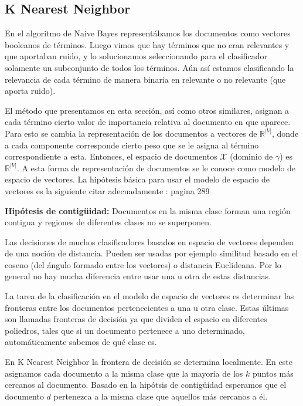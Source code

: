 \documentclass{llncs}
\begin{document}
	\subsection{K Nearest Neighbor}
	
		En el algoritmo de Naive Bayes represent\'abamos los documentos como vectores booleanos de t\'erminos. Luego vimos que hay t\'erminos que no eran relevantes y que aportaban ruido, y lo solucionamos seleccionando para el clasificador solamente un subconjunto de todos los t\'erminos. A\'un as\'i estamos clasificando la relevancia de cada t\'ermino de manera binaria en relevante o no relevante (que aporta ruido).
		
		 El m\'etodo que presentamos en esta secci\'on, as\'i como otros similares, asignan a cada t\'ermino cierto valor de importancia relativa al documento en que aparece. Para esto se cambia la representaci\'on de los documentos a vectores de $\mathbb{R}^{|V|}$, donde a cada componente corresponde cierto peso que se le asigna al t\'ermino correspondiente a esta. Entonces, el espacio de documentos $\mathcal{X}$ (dominio de $\gamma$) es $\mathbb{R}^{|V|}$. A esta forma de representaci\'on de documentos se le conoce como modelo de espacio de vectores. La hip\'otesis b\'asica para usar el modelo de espacio de vectores es la siguiente \color{red} citar adecuadamente : pagina 289 \color{black}
		 
		 \textbf{Hip\'otesis de contig\"uidad:} Documentos en la misma clase forman una regi\'on contigua  y regiones de diferentes clases no se superponen.
		 
		 Las decisiones de muchos clasificadores basados en espacio de vectores dependen de una noci\'on de distancia. Pueden ser usadas por ejemplo similitud basado en el coseno (del \'angulo formado entre los vectores) o distancia Euclideana. Por lo general no hay mucha diferencia entre usar una u otra de estas distancias.
		 
		 La tarea de la clasificaci\'on en el modelo de espacio de vectores es determinar las fronteras entre los documentos pertenecientes a una u otra clase. Estas \'ultimas son llamadas fronteras de decisi\'on ya que dividen el espacio en diferentes poliedros, tales que si un documento pertenece a uno determinado, autom\'aticamente sabemos de qu\'e clase es. 
		 
		 En K Nearest Neighbor la frontera de decisi\'on se determina localmente. En este asignamos cada documento a la misma clase que la mayor\'ia de los $k$ puntos m\'as cercanos al documento. Basado en la hip\'otsis de contig\"uidad esperamos que el documento $d$ pertenezca a la misma clase que aquellos m\'as cercanos a \'el.
		 
\end{document}
